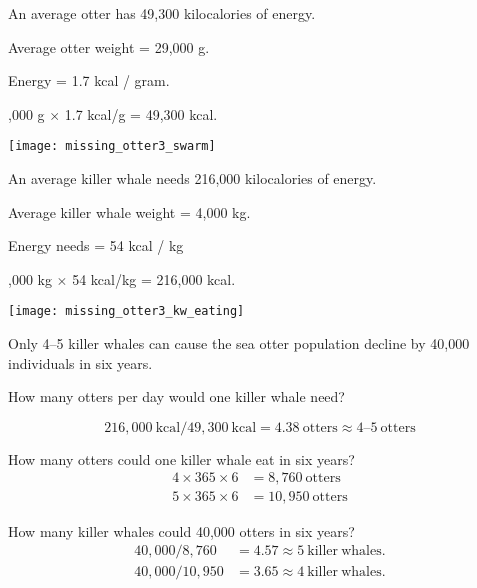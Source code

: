 \documentclass[t]{beamer}
\begin{document}
\begin{frame}[t]{An average otter has 49,300 kilocalories of energy.}

	\begin{multicols}{2}
	
	\hangpara Average otter weight = 29,000 g.
	
	\hangpara Energy = 1.7 kcal / gram.

	,000 g $\times$ 1.7 kcal/g = 49,300 kcal.

	\columnbreak
	
		\texttt{[image: missing\_otter3\_swarm]}
		
	\end{multicols}
	
\end{frame}
%
\begin{frame}[t]{An average killer whale needs 216,000 kilocalories of energy.}

	\begin{multicols}{2}
	
	\hangpara Average killer whale weight = 4,000 kg.
	
	\hangpara Energy needs = 54 kcal / kg

	,000 kg $\times$ 54 kcal/kg = 216,000 kcal.

	\columnbreak
	
		\texttt{[image: missing\_otter3\_kw\_eating]}
		
	\end{multicols}
	
\end{frame}
%
\begin{frame}[t]{Only 4--5 killer whales can cause the sea otter population decline by 40,000 individuals in six years.}

	\vspace*{-\baselineskip}
	
	\hangpara How many otters per day would one killer whale need?
		
		\[216,000\ \mathrm{kcal} / 49,300\ \mathrm{kcal} = 4.38\ \mathrm{otters} \approx 4\mathrm{–}5\ \mathrm{otters}\]
		
	\pause
	\hangpara How many otters could one killer whale eat in six years?
	\begin{align*}4 \times 365 \times 6 &= 8,760\ \mathrm{otters}\\
	5 \times 365 \times 6 &= 10,950\ \mathrm{otters}\end{align*}

	\pause
	\hangpara How many killer whales could 40,000 otters in six years?
	\begin{align*}40,000 / 8,760 &= 4.57 \approx 5\ \mathrm{killer\ whales.}\\
	40,000 / 10,950 &= 3.65 \approx 4\ \mathrm{killer\ whales.}\end{align*}

\end{frame}
%
\end{document}
